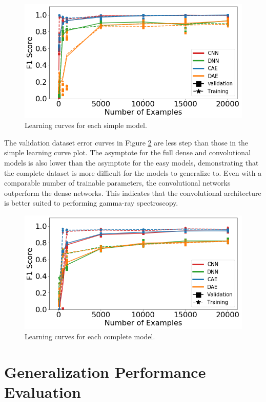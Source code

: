 \begin{figure}[H]
	\centering
	\includegraphics[width=0.9\linewidth]{images/learning_curves_easy}
	\caption{Learning curves for each simple model.}
	\label{fig:learning_curves_easy}
\end{figure}

The validation dataset error curves in Figure \ref{fig:learning_curves_full} are less step than those in the simple learning curve plot. The asymptote for the full dense and convolutional models is also lower than the asymptote for the easy models, demonstrating that the complete dataset is more difficult for the models to generalize to. Even with a comparable number of trainable parameters, the convolutional networks outperform the dense networks. This indicates that the convolutional architecture is better suited to performing gamma-ray spectroscopy. 

\begin{figure}[H]
	\centering
	\includegraphics[width=0.9\linewidth]{images/learning_curves_full}
	\caption{Learning curves for each complete model.}
	\label{fig:learning_curves_full}
\end{figure}



\section{Generalization Performance Evaluation}

